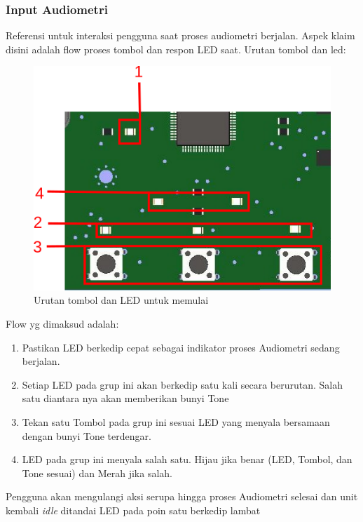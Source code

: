 \documentclass[12pt,]{article}
\begin{document}
	\subsubsection{Input Audiometri}
	
	Referensi untuk interaksi pengguna saat proses audiometri berjalan.
	Aspek klaim disini adalah flow proses tombol dan respon LED saat.
	Urutan tombol dan led:
	
	\begin{figure}[!ht]
		\centering
		\includegraphics[width=350pt]{images/ledbutton_input}
		\caption{Urutan tombol dan LED untuk memulai}
	\end{figure}

	Flow yg dimaksud adalah:
	\begin{enumerate}
		\item Pastikan LED berkedip cepat sebagai indikator proses Audiometri sedang berjalan.
		
		\item Setiap LED pada grup ini akan berkedip satu kali secara berurutan.
		Salah satu diantara nya akan memberikan bunyi Tone
		
		\item Tekan satu Tombol pada grup ini sesuai LED yang menyala bersamaan dengan bunyi Tone terdengar.
		
		\item LED pada grup ini menyala salah satu. Hijau jika benar (LED, Tombol, dan Tone sesuai) dan Merah jika salah.
	\end{enumerate}

	Pengguna akan mengulangi aksi serupa hingga proses Audiometri selesai dan unit kembali \textit{idle} ditandai LED pada poin satu berkedip lambat
	
\end{document}
